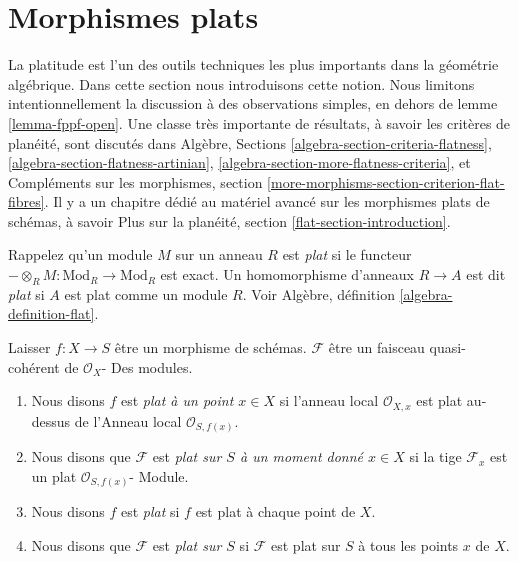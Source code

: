 \section{Morphismes plats}
\label{section-flat}

\noindent
La platitude est l'un des outils techniques les plus importants dans la géométrie algébrique. Dans cette section nous introduisons cette notion. Nous limitons intentionnellement la discussion à des observations simples, en dehors de lemme \ref{lemma-fppf-open}. Une classe très importante de résultats, à savoir les critères de planéité, sont discutés dans Algèbre, Sections \ref{algebra-section-criteria-flatness}, \ref{algebra-section-flatness-artinian}, \ref{algebra-section-more-flatness-criteria}, et Compléments sur les morphismes, section \ref{more-morphisms-section-criterion-flat-fibres}. Il y a un chapitre dédié au matériel avancé sur les morphismes plats de schémas, à savoir Plus sur la planéité, section \ref{flat-section-introduction}.

\medskip\noindent
Rappelez qu'un module $M$ sur un anneau $R$ est {\it plat} si le functeur $-\otimes_R M : \text{Mod}_R \to \text{Mod}_R$ est exact. Un homomorphisme d'anneaux $R \to A$ est dit {\it plat} si $A$ est plat comme un module $R$. Voir Algèbre, définition \ref{algebra-definition-flat}.

\begin{definition}

\label{definition-flat}

Laisser $f : X \to S$ être un morphisme de schémas. $\mathcal{F}$ être un faisceau quasi-cohérent de $\mathcal{O}_X$- Des modules.

\begin{enumerate}

\item Nous disons $f$ est {\it plat à un point $x \in X$} si l'anneau local $\mathcal{O}_{X, x}$ est plat au-dessus de l'Anneau local
$\mathcal{O}_{S, f(x)}$.
\item Nous disons que $\mathcal{F}$ est {\it plat sur $S$ à un moment donné $x \in X$} si la tige $\mathcal{F}_x$ est un plat $\mathcal{O}_{S, f(x)}$- Module.
\item Nous disons $f$ est {\it plat} si $f$ est plat à chaque point de $X$.
\item Nous disons que $\mathcal{F}$ est {\it plat sur $S$} si $\mathcal{F}$ est plat sur $S$ à tous les points $x$ de $X$.

\end{enumerate}

\end{definition}

